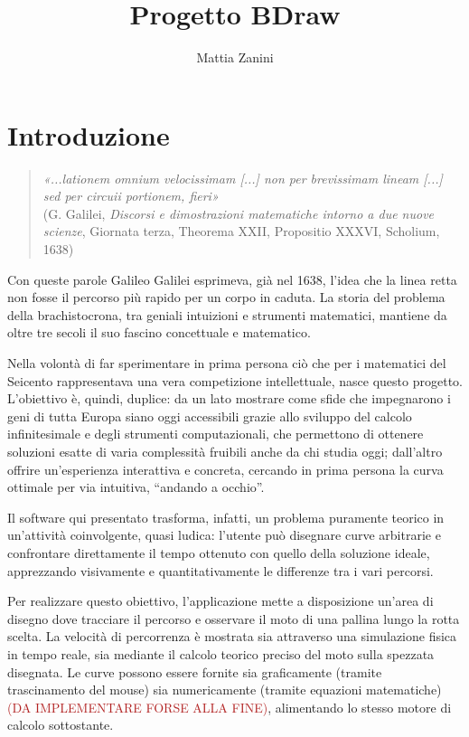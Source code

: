 \documentclass[a4paper,12pt]{article} %
\title{Progetto BDraw}
\author{Mattia Zanini}
\date{}
\begin{document}
\maketitle
\newpage

\doublespacing
\tableofcontents
\newpage

\section*{Introduzione}

\begin{quote}
    \textit{«...lationem omnium velocissimam [...] non per brevissimam lineam [...] sed per circuii portionem, fieri»} \\
    \footnotesize{(G. Galilei, \textit{Discorsi e dimostrazioni matematiche intorno a due nuove scienze}, Giornata terza, Theorema XXII, Propositio XXXVI, Scholium, 1638)}
\end{quote}

Con queste parole Galileo Galilei esprimeva, già nel 1638, l'idea che la linea retta non fosse il percorso più rapido per un corpo in caduta. La storia del problema della brachistocrona, tra geniali intuizioni e strumenti matematici, mantiene da oltre tre secoli il suo fascino concettuale e matematico.

Nella volontà di far sperimentare in prima persona ciò che per i matematici del Seicento rappresentava una vera competizione intellettuale, nasce questo progetto. L'obiettivo è, quindi, duplice: da un lato mostrare come sfide che impegnarono i geni di tutta Europa siano oggi accessibili grazie allo sviluppo del calcolo infinitesimale e degli strumenti computazionali, che permettono di ottenere soluzioni esatte di varia complessità fruibili anche da chi studia oggi; dall'altro offrire un'esperienza interattiva e concreta, cercando in prima persona la curva ottimale per via intuitiva, ``andando a occhio''.

Il software qui presentato trasforma, infatti,  un problema puramente teorico in un'attività coinvolgente, quasi ludica: l'utente può disegnare curve arbitrarie e confrontare direttamente il tempo ottenuto con quello della soluzione ideale, apprezzando visivamente e quantitativamente le differenze tra i vari percorsi.

Per realizzare questo obiettivo, l'applicazione mette a disposizione un'area di disegno dove tracciare il percorso e osservare il moto di una pallina lungo la rotta scelta. La velocità di percorrenza è mostrata sia attraverso una simulazione fisica in tempo reale, sia mediante il calcolo teorico preciso del moto sulla spezzata disegnata. Le curve possono essere fornite sia graficamente (tramite trascinamento del mouse) sia numericamente (tramite equazioni matematiche) \textcolor{firebrick}{(DA IMPLEMENTARE FORSE ALLA FINE)}, alimentando lo stesso motore di calcolo sottostante.
\end{document}
